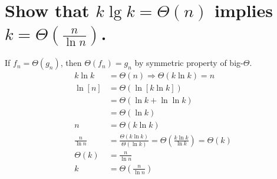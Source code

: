 \section[Problem 3]{Show that $k \lg k = \Theta(n)$ implies $k = \Theta\left(\frac{n}{\ln n}\right)$.}
If $f_n = \Theta(g_n)$, then $\Theta(f_n) = g_n$ by symmetric property of big-$\Theta$.
\begin{align*}
	k \ln k &= \Theta(n) \Longrightarrow \Theta(k \ln k) = n \\
	\ln [n] &= \Theta ( \ln [k \ln k ] ) \\
	&=
	\Theta (\ln k + \ln \ln k) \\
	&= \Theta(\ln k) \\
	n &= \Theta(k \ln k) \\
	\frac{n}{\ln n} &= \frac{\Theta(k \ln k)}{\Theta(\ln k)} = \Theta \left( \frac{k \ln k}{\ln k} \right) = \Theta(k) \\
	\Theta(k) &= \frac{n}{\ln n} \\ 
	k &= \Theta \left( \frac{n}{\ln n} \right) 
\end{align*}
